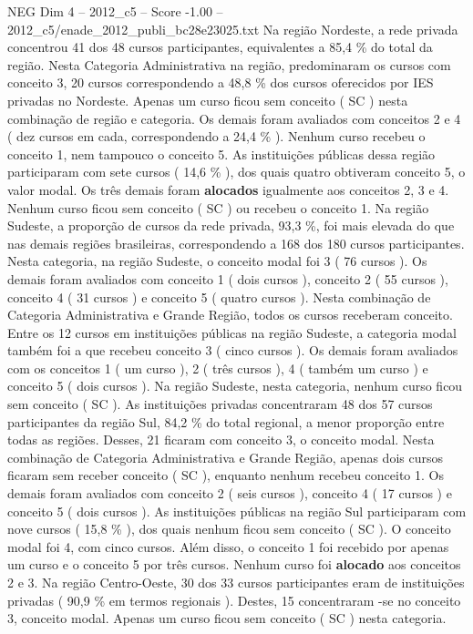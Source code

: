 \begin{textsample}{NEG Dim 4 – 2012\_c5 – Score -1.00 – 2012\_c5/enade\_2012\_publi\_bc28e23025.txt}
Na região Nordeste, a rede privada concentrou 41 dos 48 cursos participantes, equivalentes a 85,4 \% do total da região.
Nesta Categoria Administrativa na região, predominaram os cursos com conceito 3, 20 cursos correspondendo a 48,8 \% dos cursos oferecidos por IES privadas no Nordeste.
Apenas um curso ficou sem conceito ( SC ) nesta combinação de região e categoria.
Os demais foram avaliados com conceitos 2 e 4 ( dez cursos em cada, correspondendo a 24,4 \% ).
Nenhum curso recebeu o conceito 1, nem tampouco o conceito 5.
As instituições públicas dessa região participaram com sete cursos ( 14,6 \% ), dos quais quatro obtiveram conceito 5, o valor modal.
Os três demais foram \textbf{alocados} igualmente aos conceitos 2, 3 e 4.
Nenhum curso ficou sem conceito ( SC ) ou recebeu o conceito 1.
Na região Sudeste, a proporção de cursos da rede privada, 93,3 \%, foi mais elevada do que nas demais regiões brasileiras, correspondendo a 168 dos 180 cursos participantes.
Nesta categoria, na região Sudeste, o conceito modal foi 3 ( 76 cursos ).
Os demais foram avaliados com conceito 1 ( dois cursos ), conceito 2 ( 55 cursos ), conceito 4 ( 31 cursos ) e conceito 5 ( quatro cursos ).
Nesta combinação de Categoria Administrativa e Grande Região, todos os cursos receberam conceito.
Entre os 12 cursos em instituições públicas na região Sudeste, a categoria modal também foi a que recebeu conceito 3 ( cinco cursos ).
Os demais foram avaliados com os conceitos 1 ( um curso ), 2 ( três cursos ), 4 ( também um curso ) e conceito 5 ( dois cursos ).
Na região Sudeste, nesta categoria, nenhum curso ficou sem conceito ( SC ).
As instituições privadas concentraram 48 dos 57 cursos participantes da região Sul, 84,2 \% do total regional, a menor proporção entre todas as regiões.
Desses, 21 ficaram com conceito 3, o conceito modal.
Nesta combinação de Categoria Administrativa e Grande Região, apenas dois cursos ficaram sem receber conceito ( SC ), enquanto nenhum recebeu conceito 1.
Os demais foram avaliados com conceito 2 ( seis cursos ), conceito 4 ( 17 cursos ) e conceito 5 ( dois cursos ).
As instituições públicas na região Sul participaram com nove cursos ( 15,8 \% ), dos quais nenhum ficou sem conceito ( SC ).
O conceito modal foi 4, com cinco cursos.
Além disso, o conceito 1 foi recebido por apenas um curso e o conceito 5 por três cursos.
Nenhum curso foi \textbf{alocado} aos conceitos 2 e 3.
Na região Centro-Oeste, 30 dos 33 cursos participantes eram de instituições privadas ( 90,9 \% em termos regionais ).
Destes, 15 concentraram -se no conceito 3, conceito modal.
Apenas um curso ficou sem conceito ( SC ) nesta categoria.

\end{textsample}
